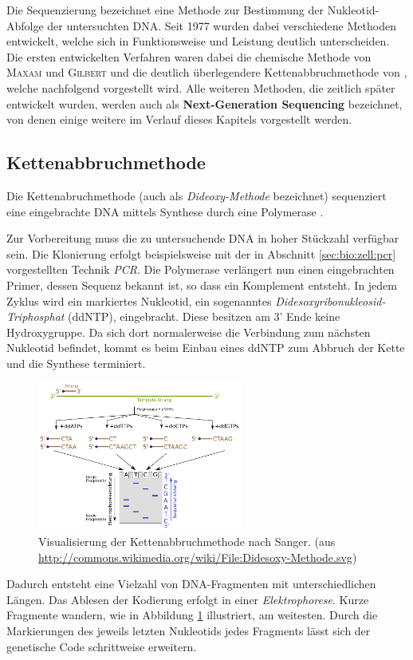 Die Sequenzierung bezeichnet eine Methode zur Bestimmung der Nukleotid-Abfolge der untersuchten DNA. Seit 1977 wurden dabei verschiedene Methoden entwickelt, welche sich in Funktionsweise und Leistung deutlich unterscheiden. Die ersten entwickelten Verfahren waren dabei die chemische Methode von \textsc{Maxam} und \textsc{Gilbert} und die deutlich überlegendere Kettenabbruchmethode von \citet{Sanger1977}, welche nachfolgend vorgestellt wird. Alle weiteren Methoden, die zeitlich später entwickelt wurden, werden auch als \textbf{Next-Generation Sequencing} bezeichnet, von denen einige weitere im Verlauf dieses Kapitels vorgestellt werden.
\subsection{Kettenabbruchmethode}
\label{sec:bio:seq:kette}

Die Kettenabruchmethode (auch als \textit{Dideoxy-Methode} bezeichnet) sequenziert eine eingebrachte DNA mittels Synthese durch eine Polymerase \citep{Jansohn2011}. 

Zur Vorbereitung muss die zu untersuchende DNA in hoher Stückzahl verfügbar sein. Die Klonierung erfolgt beispielsweise mit der in Abschnitt \ref{sec:bio:zell:pcr} vorgestellten Technik \textit{PCR}. Die Polymerase verlängert nun einen eingebrachten Primer, dessen Sequenz bekannt ist, so dass ein Komplement entsteht. In jedem Zyklus wird ein markiertes Nukleotid, ein sogenanntes \textit{Didesoxyribonukleosid-Triphosphat} (ddNTP), eingebracht. Diese besitzen am 3' Ende keine Hydroxygruppe. Da sich dort normalerweise die Verbindung zum nächsten Nukleotid befindet, kommt es beim Einbau eines ddNTP zum Abbruch der Kette und die Synthese terminiert.
\begin{figure}[htb]
	\begin{center}
		\includegraphics[width=0.6\textwidth]{bilder/Sequenzierung_Kettenabbruch}
	\end{center}
	\caption[Visualisierung der Kettenabbruchmethode nach Sanger. (aus \protect\url{http://commons.wikimedia.org/wiki/File:Didesoxy-Methode.svg})]{Visualisierung der Kettenabbruchmethode nach Sanger. (aus \protect\url{http://commons.wikimedia.org/wiki/File:Didesoxy-Methode.svg})}
	\label{fig:bio:seq:kette}
\end{figure}
Dadurch entsteht eine Vielzahl von DNA-Fragmenten mit unterschiedlichen Längen. Das Ablesen der Kodierung erfolgt in einer \textit{Elektrophorese}. Kurze Fragmente wandern, wie in Abbildung \ref{fig:bio:seq:kette} illustriert, am weitesten. Durch die Markierungen des jeweils letzten Nukleotids jedes Fragments lässt sich der genetische Code schrittweise erweitern. 


